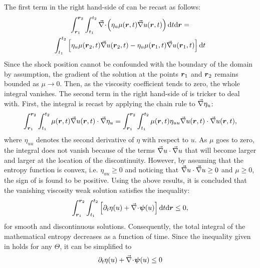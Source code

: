 %
The first term in the right hand-side of  can be recast as follows:
%
\begin{multline}\label{eq:weak_sol11_sct1b}
\int_{\boldsymbol r_1}^{\boldsymbol r_2} \int_{t_1}^{t_2}  \vec{\nabla}\! \cdot \! \left( \eta_u \mu(\boldsymbol r,t ) \vec{\nabla} u( \boldsymbol r,t) \right) \text{d}t \text{d} \boldsymbol r = \\
\int_{t_1}^{t_2} \left[ \eta_u \mu(\boldsymbol r_2,t ) \vec{\nabla} u( \boldsymbol r_2,t) - \eta_u \mu(\boldsymbol r_1,t ) \vec{\nabla} u( \boldsymbol r_1,t) \right] \text{d}t
\end{multline}
%
Since the shock position cannot be confounded with the boundary of the domain by assumption, the gradient of the solution at the points $\boldsymbol r_1$ and $\boldsymbol r_2$ remains bounded as $\mu \to 0$. Then, as the viscosity coefficient tends to zero, the whole integral vanishes. The second term in the right hand-side of  is tricker to deal with. First, the integral is recast by applying the chain rule to $\vec{\nabla} \eta_u$:
%
\begin{equation}\label{eq:weak_sol12_sct1b}
\int_{\boldsymbol r_1}^{\boldsymbol r_2} \int_{t_1}^{t_2} \mu(\boldsymbol r,t ) \vec{\nabla} u( \boldsymbol r,t) \cdot \vec{\nabla} \eta_u = \int_{\boldsymbol r_1}^{\boldsymbol r_2} \int_{t_1}^{t_2} \mu(\boldsymbol r,t ) \eta_{uu} \vec{\nabla} u( \boldsymbol r,t) \cdot \vec{\nabla} u( \boldsymbol r,t),
\end{equation}
%
where $\eta_{uu}$ denotes the second derivative of $\eta$ with respect to $u$. As $\mu$ goes to zero, the integral does not vanish because of the terms $\vec{\nabla} u \cdot \vec{\nabla} u$ that will become larger and larger at the location of the discontinuity. However, by assuming that the entropy function is convex, i.e. $\eta_{uu} \geq 0$ and noticing that $\vec{\nabla} u \cdot \vec{\nabla} u \geq 0$ and $\mu \geq 0$, the sign of  is found to be positive. Using the above results, it is concluded that the vanishing viscosity weak solution satisfies the inequality:
%
\begin{equation}\label{eq:weak_sol13_sct1b}
\int_{\boldsymbol r_1}^{\boldsymbol r_2} \int_{t_1}^{t_2} \left[ \partial_t \eta (u) + \vec{\nabla}\! \cdot \! \boldsymbol\psi (u) \right] \text{d}t \text{d} \boldsymbol r  \leq 0,
\end{equation}
% 
for smooth and discontinuous solutions. Consequently, the total integral of the mathematical entropy decreases as a function of time. Since the inequality given in  holds for any $\Theta$, it can be simplified to
%
\begin{equation}\label{eq:weak_sol14_sct1b}
\partial_t \eta (u) + \vec{\nabla}\! \cdot \! \boldsymbol\psi (u) \leq 0
\end{equation}
